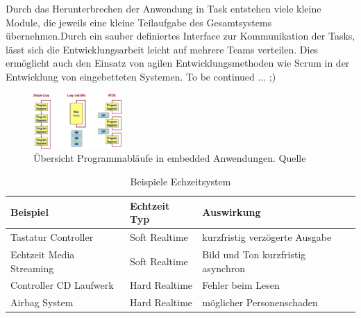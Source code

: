 Durch das Herunterbrechen der Anwendung in Task entstehen viele kleine Module, die jeweils eine kleine Teilaufgabe des Gesamtsystems übernehmen.Durch ein sauber definiertes Interface zur Kommunikation der Tasks, lässt sich die Entwicklungsarbeit leicht auf mehrere Teams verteilen. Dies ermöglicht auch den Einsatz von agilen Entwicklungsmethoden wie Scrum in der Entwicklung von eingebetteten Systemen. 
To be continued ... ;)  
\newline  
\begin{figure}
	\centering
		\includegraphics[width=0.3\textwidth]{Pictures/EmbeddedCom/cwrtos2f5c.jpg}
	\caption{Übersicht Programmabläufe in embedded Anwendungen. Quelle~\protect{}}
	\label{fig:Programmablauf}
\end{figure}

\begin{table}
\centering
	\begin{tabular}{|l|l|l|}
		\hline
		\textbf{Beispiel} & \textbf{Echtzeit Typ}  & \textbf{Auswirkung} \\
		\hline
		Tastatur Controller & Soft Realtime & kurzfristig verzögerte Ausgabe \\
		\hline
		Echtzeit Media Streaming  & Soft Realtime & Bild und Ton kurzfristig asynchron \\
		\hline
		Controller CD Laufwerk  & Hard Realtime & Fehler beim Lesen\\
		\hline
		Airbag System  & Hard Realtime & möglicher Personenschaden\\
		\hline
	\end{tabular}
	\caption{Beispiele Echzeitsystem}
	\label{tab:BeispieleEchzeitsystem}
\end{table}




